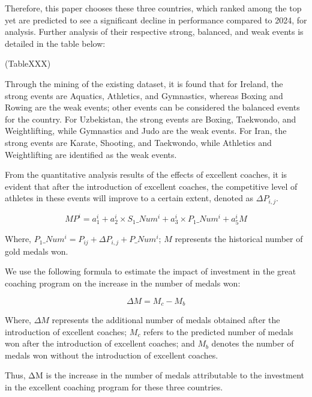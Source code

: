 \documentclass{mcmthesis}
\begin{document}
Therefore, this paper chooses these three countries, which ranked among the top yet are predicted to see a significant decline in performance compared to 2024, for analysis. Further analysis of their respective strong, balanced, and weak events is detailed in the table below:

(TableXXX)

Through the mining of the existing dataset, it is found that for Ireland, the strong events are Aquatics, Athletics, and Gymnastics, whereas Boxing and Rowing are the weak events; other events can be considered the balanced events for the country. For Uzbekistan, the strong events are Boxing, Taekwondo, and Weightlifting, while Gymnastics and Judo are the weak events. For Iran, the strong events are Karate, Shooting, and Taekwondo, while Athletics and Weightlifting are identified as the weak events.

From the quantitative analysis results of the effects of excellent coaches, it is evident that after the introduction of excellent coaches, the competitive level of athletes in these events will improve to a certain extent, denoted as $\Delta P_{i, j}$.

\begin{equation}
MP^{i} = a_{1} ^ {i} + a_{2} ^{i}\times S_{1}\_Num^{i} + a_{3}^{i}\times P_{1}\_Num^{i} + a_{5}^{i}M
\end{equation}

Where, $P_{1}\_Num^{i}=P_{ij} + \Delta P_{i, j} + P\_Num^{i}$; $M$ represents the historical number of gold medals won.

We use the following formula to estimate the impact of investment in the great coaching program on the increase in the number of medals won:

\begin{equation}
\Delta M=M_{c} - M_{b}
\end{equation}

Where, $\Delta M$ represents the additional number of medals obtained after the introduction of excellent coaches; $M_{c}$ refers to the predicted number of medals won after the introduction of excellent coaches; and $M_{b}$ denotes the number of medals won without the introduction of excellent coaches.

Thus, ΔM is the increase in the number of medals attributable to the investment in the excellent coaching program for these three countries.
\end{document}

